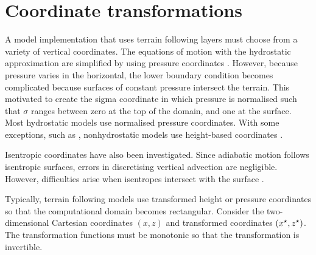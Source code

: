 \section{Coordinate transformations}
\label{sec:theory:coord-transform}

A model implementation that uses terrain following layers must choose from a variety of vertical coordinates.  The equations of motion with the hydrostatic approximation are simplified by using pressure coordinates \autocite{eliassen1949}.  However, because pressure varies in the horizontal, the lower boundary condition becomes complicated because surfaces of constant pressure intersect the terrain.  This motivated \textcite{phillips1957} to create the sigma coordinate in which pressure is normalised such that $\sigma$ ranges between zero at the top of the domain, and one at the surface.
Most hydrostatic models use normalised pressure coordinates.  With some exceptions, such as \textcite{xue-thorpe1991}, nonhydrostatic models use height-based coordinates \autocite{steppeler2003}.

Isentropic coordinates have also been investigated.  Since adiabatic motion follows isentropic surfaces, errors in discretising vertical advection are negligible.  However, difficulties arise when isentropes intersect with the surface \autocite{konor-arakawa1997}.

Typically, terrain following models use transformed height or pressure coordinates so that the computational domain becomes rectangular.
Consider the two-dimensional Cartesian coordinates $(x, z)$ and transformed coordinates $({x^\star}, {z^\star})$.  The transformation functions must be monotonic so that the transformation is invertible.

